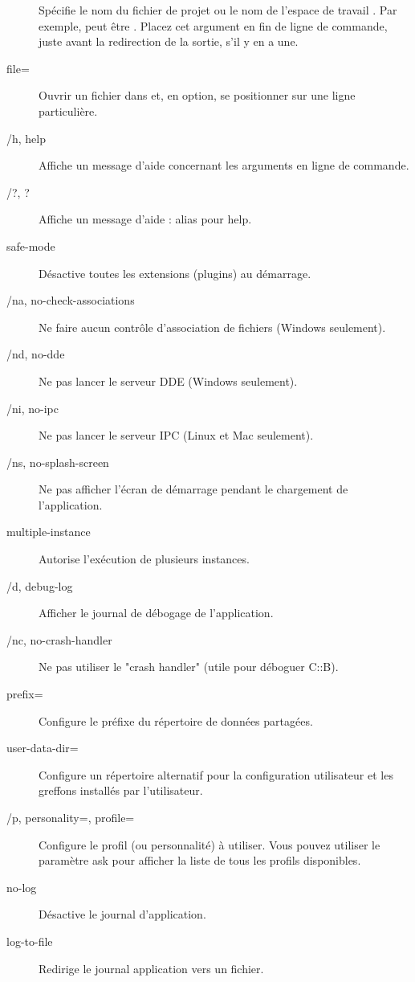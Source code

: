 \begin{description}
\item[] Spécifie le nom du fichier de projet  ou le nom de l'espace de travail . Par exemple,  peut être . Placez cet argument en fin de ligne de commande, juste avant la redirection de la sortie, s'il y en a une.
\item[\opt{--}file=] Ouvrir un fichier dans \codeblocks et, en option, se positionner sur une ligne particulière.
\item[/h, \opt{--}help] Affiche un message d'aide concernant les arguments en ligne de commande.
\item[/?, \opt{--}?] Affiche un message d'aide : alias pour help.
\item[\opt{--}safe-mode] Désactive toutes les extensions (plugins) au démarrage.
\item[/na, \opt{--}no-check-associations] Ne faire aucun contrôle d'association de fichiers (Windows seulement).
\item[/nd, \opt{--}no-dde] Ne pas lancer le serveur DDE (Windows seulement).
\item[/ni, \opt{--}no-ipc] Ne pas lancer le serveur IPC (Linux et Mac seulement).
\item[/ns, \opt{--}no-splash-screen] Ne pas afficher l'écran de démarrage pendant le chargement de l'application.
\item[\opt{--}multiple-instance] Autorise l'exécution de plusieurs instances.
\item[/d, \opt{--}debug-log] Afficher le journal de débogage de l'application.
\item[/nc, \opt{--}no-crash-handler] Ne pas utiliser le "crash handler" (utile pour déboguer C::B).
\item[\opt{--}prefix=] Configure le préfixe du répertoire de données partagées.
\item[\opt{--}user-data-dir=] Configure un répertoire alternatif pour la configuration utilisateur et les greffons installés par l'utilisateur.
\item[/p, \opt{--}personality=, \opt{--}profile=] Configure le profil (ou personnalité) à utiliser. Vous pouvez utiliser le paramètre ask pour afficher la liste de tous les profils disponibles.
\item[\opt{--}no-log] Désactive le journal d'application.
\item[\opt{--}log-to-file] Redirige le journal application vers un fichier.

\end{description}
